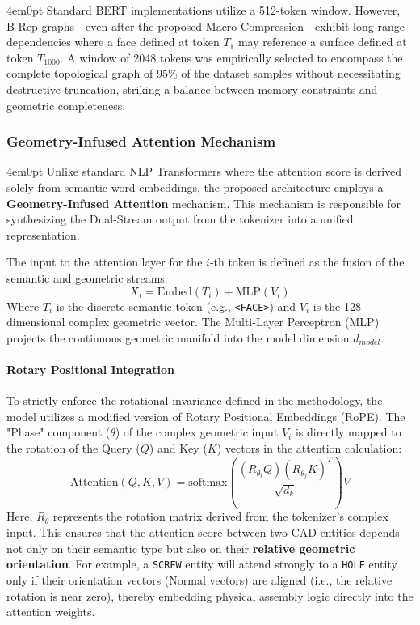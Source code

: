 \begin{indentedblock}{4em}{0pt}
		Standard BERT implementations utilize a 512-token window. However, B-Rep graphs—even after the proposed Macro-Compression—exhibit long-range dependencies where a face defined at token $T_1$ may reference a surface defined at token $T_{1000}$. A window of 2048 tokens was empirically selected to encompass the complete topological graph of 95\% of the dataset samples without necessitating destructive truncation, striking a balance between memory constraints and geometric completeness.

	\end{indentedblock}
	
	\subsubsection{Geometry-Infused Attention Mechanism}
		\begin{indentedblock}{4em}{0pt}
			Unlike standard NLP Transformers where the attention score is derived solely from semantic word embeddings, the proposed architecture employs a \textbf{Geometry-Infused Attention} mechanism. This mechanism is responsible for synthesizing the Dual-Stream output from the tokenizer into a unified representation.
			
			The input to the attention layer for the $i$-th token is defined as the fusion of the semantic and geometric streams:
			\begin{equation}
				X_i = \text{Embed}(T_i) + \text{MLP}(V_i)
			\end{equation}
			Where $T_i$ is the discrete semantic token (e.g., \texttt{<FACE>}) and $V_i$ is the 128-dimensional complex geometric vector. The Multi-Layer Perceptron (MLP) projects the continuous geometric manifold into the model dimension $d_{model}$.
			
			\paragraph{Rotary Positional Integration}
			To strictly enforce the rotational invariance defined in the methodology, the model utilizes a modified version of Rotary Positional Embeddings (RoPE). The "Phase" component ($\theta$) of the complex geometric input $V_i$ is directly mapped to the rotation of the Query ($Q$) and Key ($K$) vectors in the attention calculation:
			\begin{equation}
				\text{Attention}(Q, K, V) = \text{softmax}\left(\frac{(R_{\theta_i}Q)(R_{\theta_j}K)^T}{\sqrt{d_k}}\right)V
			\end{equation}
			Here, $R_{\theta}$ represents the rotation matrix derived from the tokenizer's complex input. This ensures that the attention score between two CAD entities depends not only on their semantic type but also on their \textbf{relative geometric orientation}. For example, a \texttt{SCREW} entity will attend strongly to a \texttt{HOLE} entity only if their orientation vectors (Normal vectors) are aligned (i.e., the relative rotation is near zero), thereby embedding physical assembly logic directly into the attention weights.
		\end{indentedblock}
	
